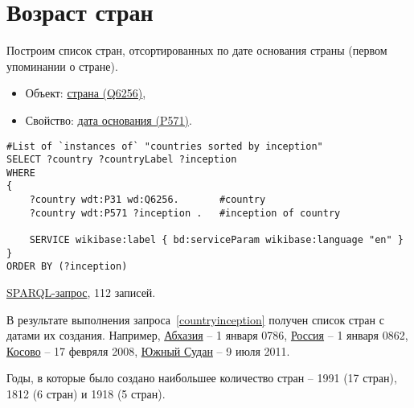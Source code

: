 \section{Возраст стран}

Построим список стран, отсортированных по дате основания страны (первом упоминании о стране).

\begin{itemize}
    \item Объект: \href{https://www.wikidata.org/wiki/Q6256}{страна (Q6256)},
    \item Свойство: \href{https://www.wikidata.org/wiki/Property:P571}{дата основания (P571)}.
\end{itemize}

\begin{lstlisting}[language=SPARQL label=countryinception, caption=Список стран упорядоченных по дате создания]
#List of `instances of` "countries sorted by inception" 
SELECT ?country ?countryLabel ?inception
WHERE
{
    ?country wdt:P31 wd:Q6256.       #country
    ?country wdt:P571 ?inception .   #inception of country
    
    SERVICE wikibase:label { bd:serviceParam wikibase:language "en" }
}
ORDER BY (?inception)
\end{lstlisting}


\href{https://query.wikidata.org/#%23List%20of%20%60instances%20of%60%20%22countries%20sorted%20by%20inception%22%20%0ASELECT%20%3Fcountry%20%3FcountryLabel%20%3Finception%0AWHERE%0A%7B%0A%20%20%20%20%3Fcountry%20wdt%3AP31%20wd%3AQ6256.%0A%20%20%20%20%3Fcountry%20wdt%3AP571%20%3Finception%20.%0A%20%20%20%20%0A%20%20%20%20SERVICE%20wikibase%3Alabel%20%7B%20bd%3AserviceParam%20wikibase%3Alanguage%20%22en%22%20%7D%0A%7D%0A%0AORDER%20BY%20%28%3Finception%29}{SPARQL-запрос}, 112 записей.

В результате выполнения запроса~\ref{countryinception} получен список стран с датами их создания. Например, \href{https://www.wikidata.org/wiki/Q23334}{Абхазия} -- 1 января 0786, \href{https://www.wikidata.org/wiki/Q159}{Россия} -- 1 января 0862, \href{https://www.wikidata.org/wiki/Q1246}{Косово} -- 17 февряля 2008, \href{https://www.wikidata.org/wiki/Q958}{Южный Судан} -- 9 июля 2011.

Годы, в которые было создано наибольшее количество стран -- 1991 (17 стран), 1812 (6 стран) и 1918 (5 стран). 